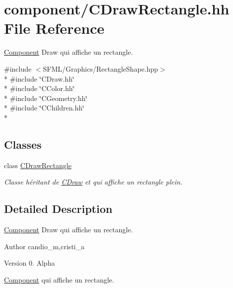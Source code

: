 \hypertarget{_c_draw_rectangle_8hh}{}\section{component/\+C\+Draw\+Rectangle.hh File Reference}
\label{_c_draw_rectangle_8hh}


\hyperlink{class_component}{Component} Draw qui affiche un rectangle.  


{\ttfamily \#include $<$S\+F\+M\+L/\+Graphics/\+Rectangle\+Shape.\+hpp$>$}\\*
{\ttfamily \#include \char`\"{}C\+Draw.\+hh\char`\"{}}\\*
{\ttfamily \#include \char`\"{}C\+Color.\+hh\char`\"{}}\\*
{\ttfamily \#include \char`\"{}C\+Geometry.\+hh\char`\"{}}\\*
{\ttfamily \#include \char`\"{}C\+Children.\+hh\char`\"{}}\\*
\subsection*{Classes}
\begin{DoxyCompactItemize}
\item 
class \hyperlink{class_c_draw_rectangle}{C\+Draw\+Rectangle}
\begin{DoxyCompactList}\small\item\em Classe héritant de \hyperlink{class_c_draw}{C\+Draw} et qui affiche un rectangle plein. \end{DoxyCompactList}\end{DoxyCompactItemize}


\subsection{Detailed Description}
\hyperlink{class_component}{Component} Draw qui affiche un rectangle. 

\begin{DoxyAuthor}{Author}
candio\+\_\+m,cristi\+\_\+a 
\end{DoxyAuthor}
\begin{DoxyVersion}{Version}
0. Alpha
\end{DoxyVersion}
\hyperlink{class_component}{Component} qui affiche un rectangle. 